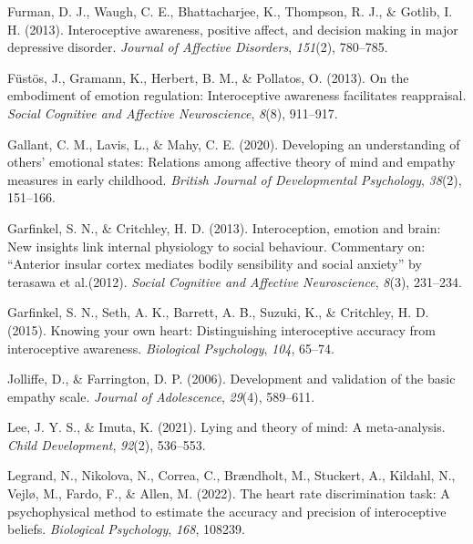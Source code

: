 \documentclass[
  man,floatsintext]{apa6}
\newlength{\cslhangindent}
\newlength{\cslentryspacingunit} %
\newenvironment{CSLReferences}[2] %
 {%
  \setlength{\parindent}{0pt}
  \ifodd #1
  \let\oldpar\par
  \def\par{\hangindent=\cslhangindent\oldpar}
  \fi
  \setlength{\parskip}{#2\cslentryspacingunit}
 }%
 {}
\begin{document}
\begin{CSLReferences}{1}{0}
\leavevmode{}%
Furman, D. J., Waugh, C. E., Bhattacharjee, K., Thompson, R. J., \& Gotlib, I. H. (2013). Interoceptive awareness, positive affect, and decision making in major depressive disorder. \emph{Journal of Affective Disorders}, \emph{151}(2), 780--785.

\leavevmode{}%
Füstös, J., Gramann, K., Herbert, B. M., \& Pollatos, O. (2013). On the embodiment of emotion regulation: Interoceptive awareness facilitates reappraisal. \emph{Social Cognitive and Affective Neuroscience}, \emph{8}(8), 911--917.

\leavevmode{}%
Gallant, C. M., Lavis, L., \& Mahy, C. E. (2020). Developing an understanding of others' emotional states: Relations among affective theory of mind and empathy measures in early childhood. \emph{British Journal of Developmental Psychology}, \emph{38}(2), 151--166.

\leavevmode{}%
Garfinkel, S. N., \& Critchley, H. D. (2013). Interoception, emotion and brain: New insights link internal physiology to social behaviour. Commentary on: {``Anterior insular cortex mediates bodily sensibility and social anxiety''} by terasawa et al.(2012). \emph{Social Cognitive and Affective Neuroscience}, \emph{8}(3), 231--234.

\leavevmode{}%
Garfinkel, S. N., Seth, A. K., Barrett, A. B., Suzuki, K., \& Critchley, H. D. (2015). Knowing your own heart: Distinguishing interoceptive accuracy from interoceptive awareness. \emph{Biological Psychology}, \emph{104}, 65--74.

\leavevmode{}%
Jolliffe, D., \& Farrington, D. P. (2006). Development and validation of the basic empathy scale. \emph{Journal of Adolescence}, \emph{29}(4), 589--611.

\leavevmode{}%
Lee, J. Y. S., \& Imuta, K. (2021). Lying and theory of mind: A meta-analysis. \emph{Child Development}, \emph{92}(2), 536--553.

\leavevmode{}%
Legrand, N., Nikolova, N., Correa, C., Brændholt, M., Stuckert, A., Kildahl, N., Vejlø, M., Fardo, F., \& Allen, M. (2022). The heart rate discrimination task: A psychophysical method to estimate the accuracy and precision of interoceptive beliefs. \emph{Biological Psychology}, \emph{168}, 108239.


\end{CSLReferences}
\end{document}
